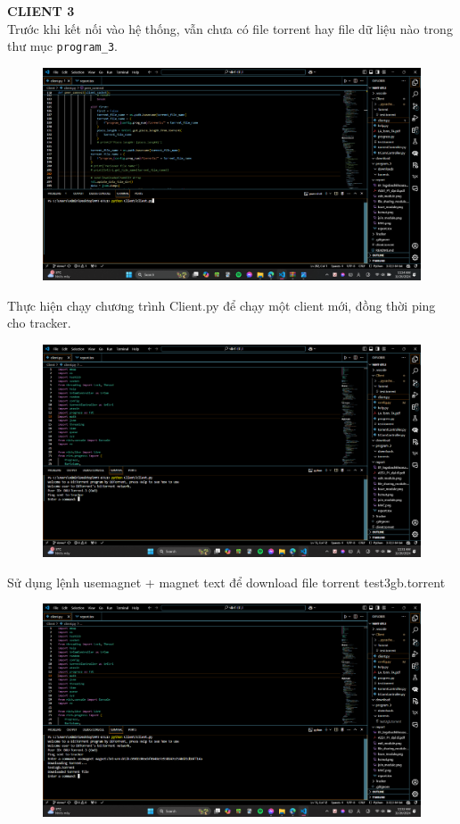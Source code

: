 \documentclass[a4paper]{article}
\begin{document}
\noindent \textbf{CLIENT 3}\\
Trước khi kết nối vào hệ thống, vẫn chưa có file torrent hay file dữ liệu nào trong thư mục \texttt{program\_3}.
\begin{figure}[H]
    \centering
    \includegraphics[width=1\textwidth]{images/25.png}
    \captionsetup{labelformat=empty}
\end{figure}
Thực hiện chạy chương trình Client.py để chạy một client mới, đồng thời ping cho tracker.
\begin{figure}[H]
    \centering
    \includegraphics[width=1\textwidth]{images/26.png}
    \captionsetup{labelformat=empty}
\end{figure}
Sử dụng lệnh usemagnet + magnet text để download file torrent test3gb.torrent
\begin{figure}[H]
    \centering
    \includegraphics[width=1\textwidth]{images/27.png}
    \captionsetup{labelformat=empty}
\end{figure}
\end{document}
